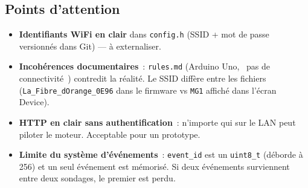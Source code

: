 \documentclass[11pt,a4paper]{article}
\begin{document}
\subsection*{Points d'attention}
\begin{warnbox}
\begin{itemize}
  \item \textbf{Identifiants WiFi en clair} dans \texttt{config.h} (SSID + mot de passe
        versionn\'es dans Git) --- \`a externaliser.
  \item \textbf{Incoh\'erences documentaires}~: \texttt{rules.md} (Arduino Uno, \guillemotleft~pas
        de connectivit\'e~\guillemotright) contredit la r\'ealit\'e. Le SSID diff\`ere entre
        les fichiers (\texttt{La\_Fibre\_dOrange\_0E96} dans le firmware vs \texttt{MG1}
        affich\'e dans l'\'ecran Device).
  \item \textbf{HTTP en clair sans authentification}~: n'importe qui sur le LAN peut piloter
        le moteur. Acceptable pour un prototype.
  \item \textbf{Limite du syst\`eme d'\'ev\'enements}~: \texttt{event\_id} est un
        \texttt{uint8\_t} (d\'eborde \`a 256) et un seul \'ev\'enement est m\'emoris\'e. Si
        deux \'ev\'enements surviennent entre deux sondages, le premier est perdu.
\end{itemize}
\end{warnbox}
\end{document}
